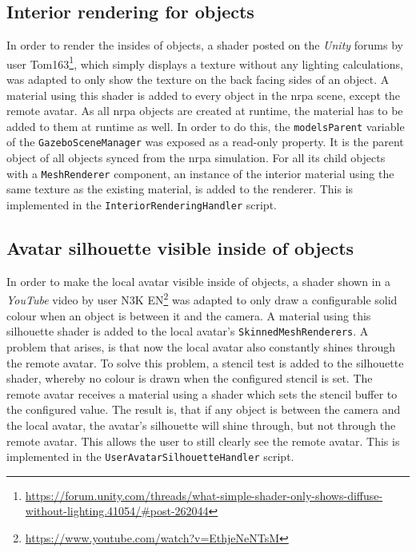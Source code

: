 \subsection{Interior rendering for objects}

In order to render the insides of objects, a shader posted on the \textit{Unity} forums by user Tom163\footnote{\url{https://forum.unity.com/threads/what-simple-shader-only-shows-diffuse-without-lighting.41054/\#post-262044}}, which simply displays a texture without any lighting calculations, was adapted to only show the texture on the back facing sides of an object. A material using this shader is added to every object in the \gls{nrpa} scene, except the remote avatar.
\newline
As all \gls{nrpa} objects are created at runtime, the material has to be added to them at runtime as well. In order to do this, the \texttt{modelsParent} variable of the \texttt{GazeboSceneManager} was exposed as a read-only property. It is the parent object of all objects synced from the \gls{nrpa} simulation. For all its child objects with a \texttt{MeshRenderer} component, an instance of the interior material using the same texture as the existing material, is added to the renderer.
\newline 
This is implemented in the \texttt{InteriorRenderingHandler} script.


\subsection{Avatar silhouette visible inside of objects}

In order to make the local avatar visible inside of objects, a shader shown in a \textit{YouTube} video by user N3K EN\footnote{\url{https://www.youtube.com/watch?v=EthjeNeNTsM}} was adapted to only draw a configurable solid colour when an object is between it and the camera. A material using this silhouette shader is added to the local avatar's \texttt{SkinnedMeshRenderers}.
\newline
A problem that arises, is that now the local avatar also constantly shines through the remote avatar. To solve this problem, a stencil test is added to the silhouette shader, whereby no colour is drawn when the configured stencil is set. The remote avatar receives a material using a shader which sets the stencil buffer to the configured value.
\newline
The result is, that if any object is between the camera and the local avatar, the avatar's silhouette will shine through, but not through the remote avatar. This allows the user to still clearly see the remote avatar.
\newline
This is implemented in the \texttt{UserAvatarSilhouetteHandler} script.


